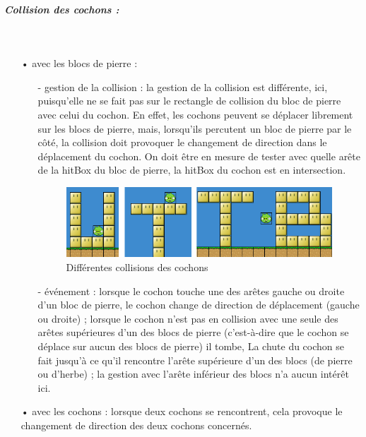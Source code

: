 \documentclass[a4paper,12pt]{report}
\begin{document}
\subparagraph{Collision des cochons :}
~\\
\begin{itemize}
\item[•] avec les blocs de pierre : 
\begin{itemize}
\item[-]gestion de la collision : la gestion de la collision est différente, ici, puisqu'elle ne se fait pas sur le rectangle de collision du bloc de pierre avec celui du cochon. En effet, les cochons peuvent se déplacer librement sur les blocs de pierre, mais, lorsqu'ils percutent un bloc de pierre par le côté, la collision doit provoquer le changement de direction dans le déplacement du cochon. On doit être en mesure de tester avec quelle arête de la hitBox du bloc de pierre, la hitBox du cochon est en intersection.

\begin{figure}[H]
\begin{center}
\includegraphics[scale=0.4]{images/collisionscochons.png} 
\end{center}
\caption{Différentes collisions des cochons}
\label{Différentes collisions des cochons}
\end{figure}

\item[-]événement : lorsque le cochon touche une des arêtes gauche ou droite d'un bloc de pierre, le cochon change de direction de déplacement (gauche ou droite) ; lorsque le cochon n'est pas en collision avec une seule des arêtes supérieures d'un des blocs de pierre (c'est-à-dire que le cochon se déplace sur aucun des blocs de pierre) il tombe, La chute du cochon se fait jusqu'à ce qu'il rencontre l'arête supérieure d'un des blocs (de pierre ou d'herbe) ; la gestion avec l’arête inférieur des blocs n'a aucun intérêt ici.
\end{itemize}
\item[•] avec les cochons : lorsque deux cochons se rencontrent, cela provoque le changement de direction des deux cochons concernés.
\end{itemize}
\end{document}
